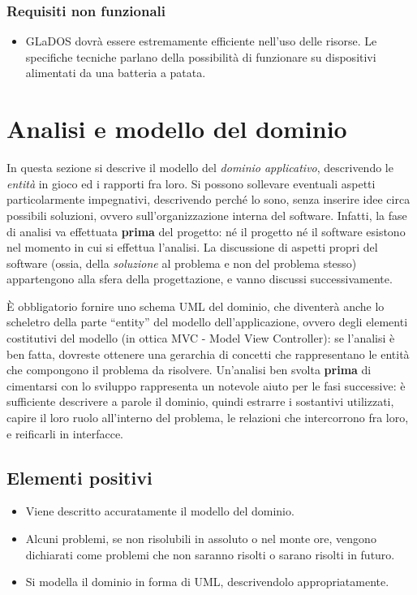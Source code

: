 \documentclass[a4paper,12pt]{report}
\begin{document}
\subsubsection{Requisiti non funzionali}
\begin{itemize}
	\item GLaDOS dovrà essere estremamente efficiente nell'uso delle risorse. Le specifiche tecniche parlano della possibilità di funzionare su dispositivi alimentati da una batteria a patata.
\end{itemize}

\section{Analisi e modello del dominio}

In questa sezione si descrive il modello del \textit{dominio 
applicativo}, descrivendo le \textit{entità} in gioco ed i rapporti fra loro.
%
Si possono sollevare eventuali aspetti particolarmente impegnativi, descrivendo perché lo sono, senza inserire idee circa possibili soluzioni, ovvero sull'organizzazione interna del software.
%
Infatti, la fase di analisi va effettuata \textbf{prima} del progetto: né il progetto né il software esistono nel momento in cui si effettua l'analisi.
%
La discussione di aspetti propri del software (ossia, della \textit{soluzione} al problema e non del problema stesso) appartengono alla sfera della progettazione, e vanno discussi successivamente.

È obbligatorio fornire uno schema UML del dominio, che diventerà anche lo scheletro della 
parte ``entity'' del modello dell'applicazione, ovvero degli elementi costitutivi del modello (in ottica MVC - Model View Controller): se 
l'analisi è ben fatta, dovreste ottenere una gerarchia di concetti che rappresentano le entità che 
compongono il problema da risolvere.
%
Un'analisi ben svolta \textbf{prima} di cimentarsi con lo sviluppo rappresenta un notevole aiuto per 
le fasi successive: è sufficiente descrivere a parole il dominio, quindi estrarre i sostantivi 
utilizzati, capire il loro ruolo all'interno del problema, le relazioni che intercorrono fra loro, e 
reificarli in interfacce.

\subsection*{Elementi positivi}
\begin{itemize}
	\item Viene descritto accuratamente il modello del dominio.
	\item Alcuni problemi, se non risolubili in assoluto o nel monte ore, vengono dichiarati come problemi che non saranno risolti o sarano risolti in futuro.
	\item Si modella il dominio in forma di UML, descrivendolo appropriatamente.
\end{itemize}
\end{document}
